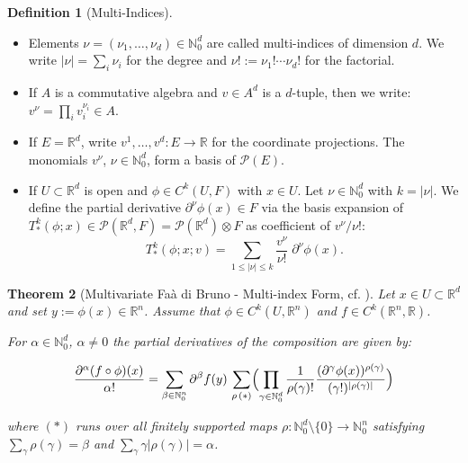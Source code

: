 \documentclass[10pt,a4paper]{article}
\theoremstyle{plain}
\newtheorem{theorem}{Theorem}
\theoremstyle{definition}
\newtheorem{definition}[theorem]{Definition}
\newcommand{\IR}{\mathbb{R}} %
\newcommand{\IN}{\mathbb{N}} %
\newcommand{\del}{\partial} %
\newcommand{\1}{\mathbb{1}} %
\newcommand{\set}[1]{\{#1\}} %
\newcommand{\ra}{\rightarrow} %
\newcommand{\tensor}{\otimes} %
\begin{document}
\begin{definition}[Multi-Indices]

\leavevmode

\begin{itemize}
\item
  Elements \(\nu = (\nu_1,\dots,\nu_d) \in \IN_0^d\) are called
  multi-indices of dimension \(d\). We write \(|\nu| = \sum_i \nu_i\)
  for the degree and \(\nu! := \nu_1! \cdots \nu_d!\) for the factorial.
\item
  If \(A\) is a commutative algebra and \(v \in A^d\) is a \(d\)-tuple,
  then we write: \(v^\nu = \prod_i v_i^{\nu_i} \in A\).
\item
  If \(E = \IR^d\), write \(v^1,\dots,v^d: E \ra \IR\) for the
  coordinate projections. The monomials \(v^\nu\), \(\nu \in \IN_0^d\),
  form a basis of \(\mathcal{P}(E)\).
\item
  If \(U \subset \IR^d\) is open and \(\phi \in C^k(U, F)\) with
  \(x \in U\). Let \(\nu \in \IN_0^d\) with \(k = |\nu|\). We define the
  partial derivative \(\del^\nu \phi (x) \in F\) via the basis expansion
  of
  \(T_{\ast}^k(\phi; x) \in \mathcal{P}(\IR^d,F) = \mathcal{P}(\IR^d) \tensor F\)
  as coefficient of \(v^\nu/\nu!\): \[
      T_{\ast}^k(\phi; x; v) = \sum_{1 \leq |\nu| \leq k} \frac{v^\nu}{\nu!} \; \del^\nu \phi(x).
    \]
\end{itemize}

\end{definition}

\begin{theorem}[Multivariate Faà di Bruno - Multi-index Form, cf. \citep{CS1996}]

\label{thm:fdb-multi} Let \(x \in U \subset \IR^d\) and set
\(y := \phi(x) \in \IR^n\). Assume that \(\phi \in C^k(U, \IR^n)\) and
\(f \in C^k(\IR^n, \IR)\).

For \(\alpha \in \IN_0^d\), \(\alpha \neq 0\) the partial derivatives of
the composition are given by:

\begin{align*}
  \frac{\del^\alpha (f \circ \phi) (x)}{\alpha!}
=
  \sum_{\beta\in\IN_0^n}
  \del^\beta f(y)\,
  \sum_{\rho\,(\ast)}
  \Bigl(
    \prod_{\gamma \in \IN_0^d}
    \frac{1}{\rho(\gamma)!}
    \frac{(\del^\gamma \phi(x))^{\rho(\gamma)}}{(\gamma!)^{|\rho(\gamma)|}}
  \Bigr)
\end{align*}

where \((\ast)\) runs over all finitely supported maps
\(\rho:\IN_0^d\setminus\set{0} \ra \IN_0^n\) satisfying
\(\sum_\gamma \rho(\gamma) = \beta\) and
\(\sum_\gamma \gamma|\rho(\gamma)| = \alpha\).

\end{theorem}
\end{document}
